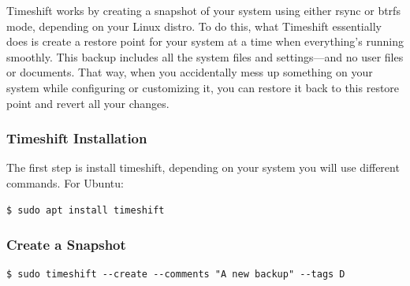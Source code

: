 \documentclass{article}
\newenvironment{codetemplate}[1][]{%
  \mybasecolorbox[#1]
  \itshape
}{%
  \endmybasecolorbox
}
\begin{document}
Timeshift works by creating a snapshot of your system using either rsync or btrfs mode, depending on your Linux distro. To do this, what Timeshift essentially does is create a restore point for your system at a time when everything's running smoothly. This backup includes all the system files and settings—and no user files or documents. That way, when you accidentally mess up something on your system while configuring or customizing it, you can restore it back to this restore point and revert all your changes.

\subsubsection{Timeshift Installation}
The first step is install timeshift, depending on your system you will use different commands. For Ubuntu:
\begin{codetemplate}{}
\begin{verbatim}
$ sudo apt install timeshift
\end{verbatim}
\end{codetemplate}

\subsubsection{Create a Snapshot}
\begin{codetemplate}{}
\begin{verbatim}
$ sudo timeshift --create --comments "A new backup" --tags D
\end{verbatim}
\end{codetemplate}
\end{document}
